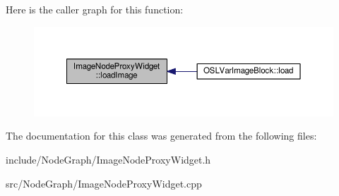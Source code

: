 Here is the caller graph for this function\-:
\nopagebreak
\begin{figure}[H]
\begin{center}
\leavevmode
\includegraphics[width=350pt]{class_image_node_proxy_widget_a0930cf7ae23b7056c46f8ecd510f1542_icgraph}
\end{center}
\end{figure}




The documentation for this class was generated from the following files\-:\begin{DoxyCompactItemize}
\item 
include/\-Node\-Graph/Image\-Node\-Proxy\-Widget.\-h\item 
src/\-Node\-Graph/Image\-Node\-Proxy\-Widget.\-cpp\end{DoxyCompactItemize}
